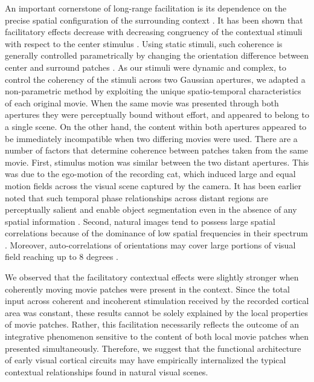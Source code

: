 An important cornerstone of long-range facilitation is its dependence on
the precise spatial configuration of the surrounding context
\citep{nelson1985a}. It has been shown that facilitatory effects decrease
with decreasing congruency of the contextual stimuli with respect to the
center stimulus \citep{polat1998a, kapadia1995a}. Using static stimuli,
such coherence is generally controlled parametrically by changing the
orientation difference between center and surround patches
\citep{levitt1997a, polat1998a, sillito1995a, chisum2003a}. As our stimuli
were dynamic and complex, to control the coherency of the stimuli across
two Gaussian apertures, we adapted a non-parametric method by exploiting
the unique spatio-temporal characteristics of each original movie. When the
same movie was presented through both apertures they were perceptually
bound without effort, and appeared to belong to a single scene. On the
other hand, the content within both apertures appeared to be immediately
incompatible when two differing movies were used. There are a number of
factors that determine coherence between patches taken from the same movie.
First, stimulus motion was similar between the two distant apertures. This
was due to the ego-motion of the recording cat, which induced large and
equal motion fields across the visual scene captured by the camera. It has
been earlier noted that such temporal phase relationships across distant
regions are perceptually salient and enable object segmentation even in the
absence of any spatial information \citep{Lee1999a}. Second, natural images
tend to possess large spatial correlations because of the dominance of low
spatial frequencies in their spectrum \citep{simoncelli2001a}. Moreover,
auto-correlations of orientations may cover large portions of visual field
reaching up to 8 degrees \citep{Kayser2003a}.

We observed that the facilitatory contextual effects were slightly stronger
when coherently moving movie patches were present in the context. Since the
total input across coherent and incoherent stimulation received by the
recorded cortical area was constant, these results cannot be solely
explained by the local properties of movie patches. Rather, this
facilitation necessarily reflects the outcome of an integrative phenomenon
sensitive to the content of both local movie patches when presented
simultaneously. Therefore, we suggest that the functional architecture of
early visual cortical circuits may have empirically internalized the
typical contextual relationships found in natural visual scenes.

